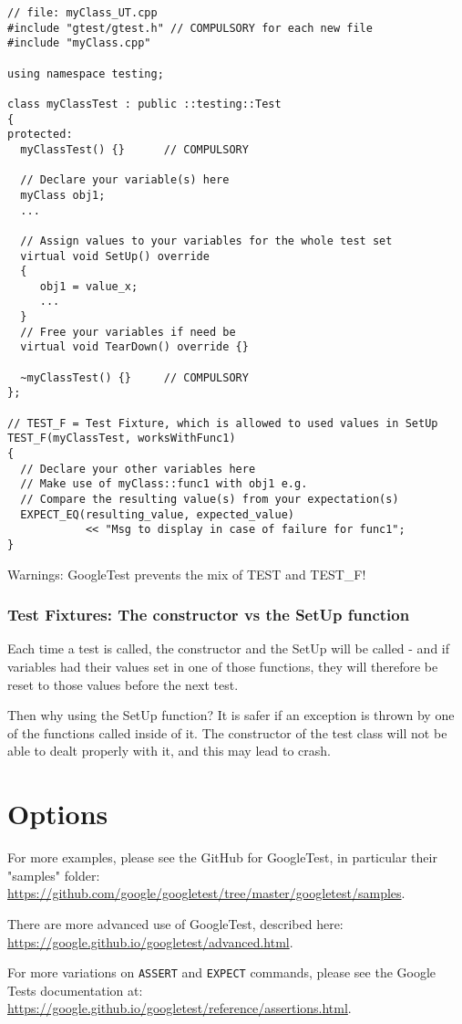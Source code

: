 \documentclass{article}
\begin{document}
\begin{verbatim}
// file: myClass_UT.cpp
#include "gtest/gtest.h" // COMPULSORY for each new file
#include "myClass.cpp"  

using namespace testing;

class myClassTest : public ::testing::Test
{
protected:
  myClassTest() {}      // COMPULSORY
  
  // Declare your variable(s) here
  myClass obj1;
  ...
  
  // Assign values to your variables for the whole test set
  virtual void SetUp() override
  {
     obj1 = value_x;
     ...
  }
  // Free your variables if need be
  virtual void TearDown() override {}
  
  ~myClassTest() {}     // COMPULSORY
};

// TEST_F = Test Fixture, which is allowed to used values in SetUp
TEST_F(myClassTest, worksWithFunc1)
{
  // Declare your other variables here
  // Make use of myClass::func1 with obj1 e.g.
  // Compare the resulting value(s) from your expectation(s)
  EXPECT_EQ(resulting_value, expected_value)
            << "Msg to display in case of failure for func1";
}
\end{verbatim}

Warnings: GoogleTest prevents the mix of TEST and TEST\_F!

\subsubsection{Test Fixtures: The constructor vs the SetUp function}

Each time a test is called, the constructor and the SetUp will be called - and if variables had their values set in one of those functions, they will therefore be reset to those values before the next test.

Then why using the SetUp function? It is safer if an exception is thrown by one of the functions called inside of it. The constructor of the test class will not be able to dealt properly with it, and this may lead to crash.

\section{Options}

For more examples, please see the GitHub for GoogleTest, in particular their "samples" folder: \url{https://github.com/google/googletest/tree/master/googletest/samples}.
\bigskip

There are more advanced use of GoogleTest, described here: \url{https://google.github.io/googletest/advanced.html}.
\bigskip

For more variations on \texttt{ASSERT} and \texttt{EXPECT} commands, please see the Google Tests documentation at: \url{https://google.github.io/googletest/reference/assertions.html}.
\end{document}
